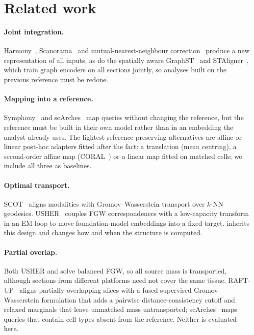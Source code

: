 \section{Related work}\label{sec:related}
\paragraph{Joint integration.}
Harmony~\citep{korsunsky2019harmony}, Scanorama~\citep{hie2019scanorama} and mutual-nearest-neighbour
correction~\citep{haghverdi2018mnn} produce a new representation of all inputs, as do the spatially aware
GraphST~\citep{long2023graphst} and STAligner~\citep{zhou2023staligner}, which train graph encoders on all sections
jointly, so analyses built on the previous reference must be redone.

\paragraph{Mapping into a reference.}
Symphony~\citep{kang2021symphony} and scArches~\citep{lotfollahi2022scarches} map queries without changing the
reference, but the reference must be built in their own model rather than in an embedding the analyst already uses.
The lightest reference-preserving alternatives are affine or linear post-hoc adapters fitted after the fact: a
translation (mean centring), a second-order affine map (CORAL~\citep{sun2016coral}) or a linear map fitted on matched
cells; we include all three as baselines.

\paragraph{Optimal transport.}
SCOT~\citep{demetci2022scot} aligns modalities with Gromov--Wasserstein transport over $k$-NN geodesics. USHER~\citep{pratapa2025usher} couples
FGW correspondences with a low-capacity transform in an EM loop to move foundation-model embeddings into a fixed
target. \frost inherits this design and changes how and when the structure is computed.

\paragraph{Partial overlap.}
Both USHER and \frost solve balanced FGW, so all source mass is transported, although sections from different platforms
need not cover the same tissue. RAFT-UP~\citep{wu2026raftup} aligns partially overlapping slices with a fused supervised
Gromov--Wasserstein formulation that adds a pairwise distance-consistency cutoff and relaxed marginals that leave
unmatched mass untransported; scArches~\citep{lotfollahi2022scarches} maps queries that contain cell types absent from
the reference. Neither is evaluated here.

